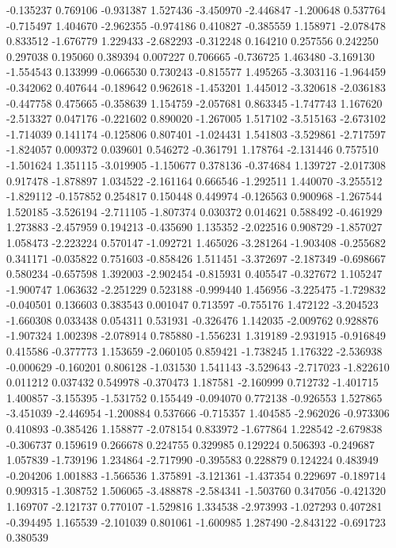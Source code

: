 -0.135237
0.769106
-0.931387
1.527436
-3.450970
-2.446847
-1.200648
0.537764
-0.715497
1.404670
-2.962355
-0.974186
0.410827
-0.385559
1.158971
-2.078478
0.833512
-1.676779
1.229433
-2.682293
-0.312248
0.164210
0.257556
0.242250
0.297038
0.195060
0.389394
0.007227
0.706665
-0.736725
1.463480
-3.169130
-1.554543
0.133999
-0.066530
0.730243
-0.815577
1.495265
-3.303116
-1.964459
-0.342062
0.407644
-0.189642
0.962618
-1.453201
1.445012
-3.320618
-2.036183
-0.447758
0.475665
-0.358639
1.154759
-2.057681
0.863345
-1.747743
1.167620
-2.513327
0.047176
-0.221602
0.890020
-1.267005
1.517102
-3.515163
-2.673102
-1.714039
0.141174
-0.125806
0.807401
-1.024431
1.541803
-3.529861
-2.717597
-1.824057
0.009372
0.039601
0.546272
-0.361791
1.178764
-2.131446
0.757510
-1.501624
1.351115
-3.019905
-1.150677
0.378136
-0.374684
1.139727
-2.017308
0.917478
-1.878897
1.034522
-2.161164
0.666546
-1.292511
1.440070
-3.255512
-1.829112
-0.157852
0.254817
0.150448
0.449974
-0.126563
0.900968
-1.267544
1.520185
-3.526194
-2.711105
-1.807374
0.030372
0.014621
0.588492
-0.461929
1.273883
-2.457959
0.194213
-0.435690
1.135352
-2.022516
0.908729
-1.857027
1.058473
-2.223224
0.570147
-1.092721
1.465026
-3.281264
-1.903408
-0.255682
0.341171
-0.035822
0.751603
-0.858426
1.511451
-3.372697
-2.187349
-0.698667
0.580234
-0.657598
1.392003
-2.902454
-0.815931
0.405547
-0.327672
1.105247
-1.900747
1.063632
-2.251229
0.523188
-0.999440
1.456956
-3.225475
-1.729832
-0.040501
0.136603
0.383543
0.001047
0.713597
-0.755176
1.472122
-3.204523
-1.660308
0.033438
0.054311
0.531931
-0.326476
1.142035
-2.009762
0.928876
-1.907324
1.002398
-2.078914
0.785880
-1.556231
1.319189
-2.931915
-0.916849
0.415586
-0.377773
1.153659
-2.060105
0.859421
-1.738245
1.176322
-2.536938
-0.000629
-0.160201
0.806128
-1.031530
1.541143
-3.529643
-2.717023
-1.822610
0.011212
0.037432
0.549978
-0.370473
1.187581
-2.160999
0.712732
-1.401715
1.400857
-3.155395
-1.531752
0.155449
-0.094070
0.772138
-0.926553
1.527865
-3.451039
-2.446954
-1.200884
0.537666
-0.715357
1.404585
-2.962026
-0.973306
0.410893
-0.385426
1.158877
-2.078154
0.833972
-1.677864
1.228542
-2.679838
-0.306737
0.159619
0.266678
0.224755
0.329985
0.129224
0.506393
-0.249687
1.057839
-1.739196
1.234864
-2.717990
-0.395583
0.228879
0.124224
0.483949
-0.204206
1.001883
-1.566536
1.375891
-3.121361
-1.437354
0.229697
-0.189714
0.909315
-1.308752
1.506065
-3.488878
-2.584341
-1.503760
0.347056
-0.421320
1.169707
-2.121737
0.770107
-1.529816
1.334538
-2.973993
-1.027293
0.407281
-0.394495
1.165539
-2.101039
0.801061
-1.600985
1.287490
-2.843122
-0.691723
0.380539
